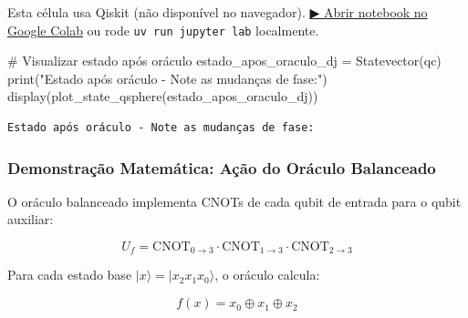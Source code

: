 \documentclass[
  brazilian,
]{report}
\newenvironment{Shaded}{\begin{snugshade}}{\end{snugshade}}
\newcommand{\BuiltInTok}[1]{\textcolor[rgb]{0.00,0.23,0.31}{#1}}
\newcommand{\CommentTok}[1]{\textcolor[rgb]{0.37,0.37,0.37}{#1}}
\newcommand{\NormalTok}[1]{\textcolor[rgb]{0.00,0.23,0.31}{#1}}
\newcommand{\OperatorTok}[1]{\textcolor[rgb]{0.37,0.37,0.37}{#1}}
\newcommand{\StringTok}[1]{\textcolor[rgb]{0.13,0.47,0.30}{#1}}
\begin{document}
\begin{tcolorbox}[enhanced jigsaw, arc=.35mm, bottomrule=.15mm, bottomtitle=1mm, breakable, colback=white, colbacktitle=quarto-callout-warning-color!10!white, colframe=quarto-callout-warning-color-frame, coltitle=black, left=2mm, leftrule=.75mm, opacityback=0, opacitybacktitle=0.6, rightrule=.15mm, title=\textcolor{quarto-callout-warning-color}{\faExclamationTriangle}\hspace{0.5em}{⚛️ Célula Qiskit --- execute no Colab ou localmente}, titlerule=0mm, toprule=.15mm, toptitle=1mm]

Esta célula usa Qiskit (não disponível no navegador).
\href{https://colab.research.google.com/github/maxwellamaral/aula-quantum/blob/main/notebooks/05-interference.ipynb}{▶
Abrir notebook no Google Colab} ou rode \texttt{uv\ run\ jupyter\ lab}
localmente.

\begin{Shaded}
\begin{Highlighting}[]

\CommentTok{\# Visualizar estado após oráculo}
\NormalTok{estado\_apos\_oraculo\_dj }\OperatorTok{=}\NormalTok{ Statevector(qc)}
\BuiltInTok{print}\NormalTok{(}\StringTok{"Estado após oráculo {-} Note as mudanças de fase:"}\NormalTok{)}
\NormalTok{display(plot\_state\_qsphere(estado\_apos\_oraculo\_dj))}
\end{Highlighting}
\end{Shaded}

\end{tcolorbox}

\begin{verbatim}
Estado após oráculo - Note as mudanças de fase:
\end{verbatim}

\subsubsection{Demonstração Matemática: Ação do Oráculo
Balanceado}\label{demonstrauxe7uxe3o-matemuxe1tica-auxe7uxe3o-do-oruxe1culo-balanceado}

O oráculo balanceado implementa CNOTs de cada qubit de entrada para o
qubit auxiliar:

\[U_f = \text{CNOT}_{0 \to 3} \cdot \text{CNOT}_{1 \to 3} \cdot \text{CNOT}_{2 \to 3}\]

Para cada estado base \(|x\rangle = |x_2x_1x_0\rangle\), o oráculo
calcula:

\[f(x) = x_0 \oplus x_1 \oplus x_2\]
\end{document}
